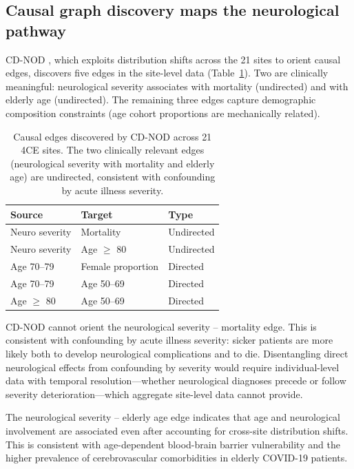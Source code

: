 \documentclass{article}
\begin{document}
\subsection{Causal graph discovery maps the neurological pathway}

CD-NOD \cite{huang2020cdnod}, which exploits distribution shifts across the 21 sites to orient causal edges, discovers five edges in the site-level data (Table~\ref{tab:cdnod}). Two are clinically meaningful: neurological severity associates with mortality (undirected) and with elderly age (undirected). The remaining three edges capture demographic composition constraints (age cohort proportions are mechanically related).

\begin{table}[t]
\centering
\caption{Causal edges discovered by CD-NOD across 21 4CE sites. The two clinically relevant edges (neurological severity with mortality and elderly age) are undirected, consistent with confounding by acute illness severity.}
\label{tab:cdnod}
\begin{tabular}{lll}
\toprule
Source & Target & Type \\
\midrule
Neuro severity & Mortality & Undirected \\
Neuro severity & Age $\geq$ 80 & Undirected \\
Age 70--79 & Female proportion & Directed \\
Age 70--79 & Age 50--69 & Directed \\
Age $\geq$ 80 & Age 50--69 & Directed \\
\bottomrule
\end{tabular}
\end{table}

CD-NOD cannot orient the neurological severity -- mortality edge. This is consistent with confounding by acute illness severity: sicker patients are more likely both to develop neurological complications and to die. Disentangling direct neurological effects from confounding by severity would require individual-level data with temporal resolution---whether neurological diagnoses precede or follow severity deterioration---which aggregate site-level data cannot provide.

The neurological severity -- elderly age edge indicates that age and neurological involvement are associated even after accounting for cross-site distribution shifts. This is consistent with age-dependent blood-brain barrier vulnerability and the higher prevalence of cerebrovascular comorbidities in elderly COVID-19 patients.
\end{document}
